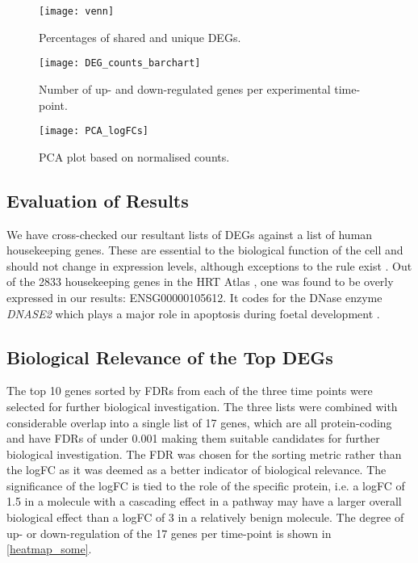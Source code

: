 \begin{figure}[!h]
    \centering
    \texttt{[image: venn]}
    \caption{Percentages of shared and unique \ac{DEG}s.} 
    \label{fig:venn}
\end{figure}

\begin{figure}[!h]
    \centering
    \texttt{[image: DEG\_counts\_barchart]}
    \caption{Number of up- and down-regulated genes per experimental time-point.} 
    \label{fig:DEG_counts_barchart}
\end{figure}

\begin{figure}[!h]
    \centering
    \texttt{[image: PCA\_logFCs]}
    \caption{PCA plot based on normalised counts.}
    \label{fig:PCA_logFCs}
\end{figure}
\clearpage




\subsection{Evaluation of Results}

We have cross-checked our resultant lists of \ac{DEG}s against a list of human housekeeping genes. These are essential to the biological function of the cell and should not change in expression levels, although exceptions to the rule exist \citep{khimani2005housekeeping}. Out of the 2833 housekeeping genes in the HRT Atlas \citep{hounkpe2021hrt}, one was found to be overly expressed in our results: ENSG00000105612. It codes for the DNase enzyme \textit{DNASE2} which plays a major role in apoptosis during foetal development \citep{yasuda1998structure}. 


\subsection{Biological Relevance of the Top DEGs}
The top 10 genes sorted by \ac{FDR}s from each of the three time points were selected for further biological investigation. The three lists were combined with considerable overlap into a single list of 17 genes, which are all protein-coding and have \ac{FDR}s of under 0.001 making them suitable candidates for further biological investigation. The \ac{FDR} was chosen for the sorting metric rather than the \ac{logFC} as it was deemed as a better indicator of biological relevance. The significance of the \ac{logFC} is tied to the role of the specific protein, i.e. a \ac{logFC} of 1.5 in a molecule with a cascading effect in a pathway may have a larger overall biological effect than a \ac{logFC} of 3 in a relatively benign molecule. The degree of up- or down-regulation of the 17 genes per time-point is shown in \autoref{heatmap_some}.

